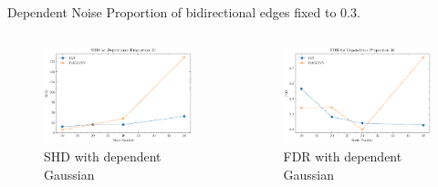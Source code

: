 \documentclass{beamer}
\begin{document}
\begin{frame}[allowframebreaks]{Dependent Noise}
    Proportion of bidirectional edges fixed to 0.3.
    \begin{columns}
        \begin{column}{0.5\textwidth}
            \begin{figure}
                \centering
                \includegraphics[width=\textwidth]{fig/SHD_dependence_30.pdf}
                \caption{SHD with dependent Gaussian}
                \label{fig:dep_gaussian_shd}
            \end{figure}
        \end{column}
        \begin{column}{0.5\textwidth}
            \begin{figure}
                \centering
                \includegraphics[width=\textwidth]{fig/FDR_dependence_30.pdf}
                \caption{FDR with dependent Gaussian}
                \label{fig:dep_gaussian_fdr}
            \end{figure}
        \end{column}
    \end{columns}


\end{frame}
\end{document}
